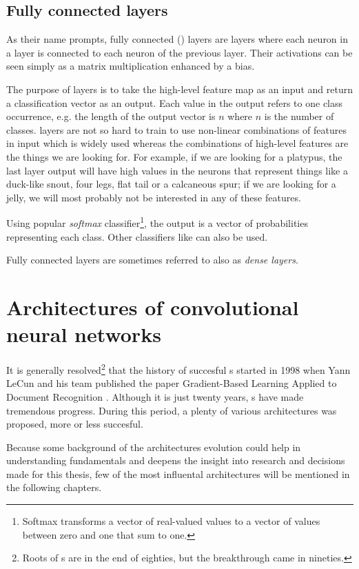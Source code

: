 \subsection{Fully connected layers}
\label{fc-layers}

As their name prompts, fully connected () layers are layers where each neuron in a layer is connected to each neuron of the previous layer. Their activations can be seen simply as a matrix multiplication enhanced by a bias.  

The purpose of  layers is to take the high-level feature map as an input and return a classification vector as an output. Each value in the output refers to one class occurrence, e.g. the length of the output vector is $n$ where $n$ is the number of classes.  layers are not so hard to train to use non-linear combinations of features in input which is widely used whereas the combinations of high-level features are the things we are looking for. For example, if we are looking for a platypus, the last layer output will have high values in the neurons that represent things like a duck-like snout, four legs, flat tail or a calcaneous spur; if we are looking for a jelly, we will most probably not be interested in any of these features. 

Using popular \textit{softmax} classifier\footnote{Softmax transforms a vector of real-valued values to a vector of values between zero and one that sum to one.}, the output is a vector of probabilities representing each class. Other classifiers like  can also be used. 

Fully connected layers are sometimes referred to also as \textit{dense layers}.

\section{Architectures of convolutional neural networks}
\label{cnn-architectures}

It is generally resolved\footnote{Roots of s are in the end of eighties, but the breakthrough came in nineties.} that the history of succesful s started in 1998 when Yann LeCun and his team published the paper Gradient-Based Learning Applied to Document Recognition \cite{lenet5}. Although it is just twenty years, s have made tremendous progress. During this period, a plenty of various architectures was proposed, more or less succesful.

Because some background of the  architectures evolution could help in understanding  fundamentals and deepens the insight into research and decisions made for this thesis, few of the most influental architectures will be mentioned in the following chapters.

